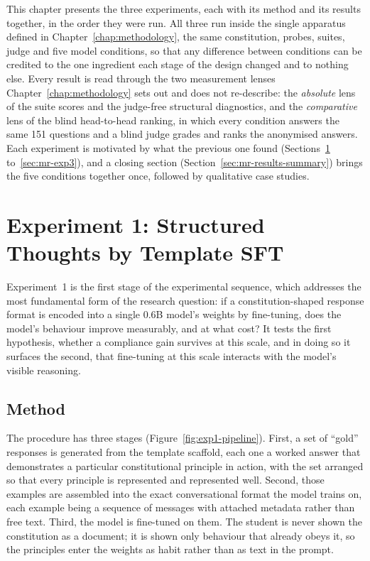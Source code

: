 This chapter presents the three experiments, each with its method and its results together, in the order they were run. All three run inside the single apparatus defined in Chapter~\ref{chap:methodology}, the same constitution, probes, suites, judge and five model conditions, so that any difference between conditions can be credited to the one ingredient each stage of the design changed and to nothing else. Every result is read through the two measurement lenses Chapter~\ref{chap:methodology} sets out and does not re-describe: the \emph{absolute} lens of the suite scores and the judge-free structural diagnostics, and the \emph{comparative} lens of the blind head-to-head ranking, in which every condition answers the same 151 questions and a blind judge grades and ranks the anonymised answers. Each experiment is motivated by what the previous one found (Sections~\ref{sec:mr-exp1} to~\ref{sec:mr-exp3}), and a closing section (Section~\ref{sec:mr-results-summary}) brings the five conditions together once, followed by qualitative case studies.

\section{Experiment 1: Structured Thoughts by Template SFT}
\label{sec:mr-exp1}

Experiment~1 is the first stage of the experimental sequence, which addresses the most fundamental form of the research question: if a constitution-shaped response format is encoded into a single 0.6B model's weights by fine-tuning, does the model's behaviour improve measurably, and at what cost? It tests the first hypothesis, whether a compliance gain survives at this scale, and in doing so it surfaces the second, that fine-tuning at this scale interacts with the model's visible reasoning.

\subsection{Method}
\label{subsec:mr-exp1-method}

The procedure has three stages (Figure~\ref{fig:exp1-pipeline}). First, a set of ``gold'' responses is generated from the template scaffold, each one a worked answer that demonstrates a particular constitutional principle in action, with the set arranged so that every principle is represented and represented well. Second, those examples are assembled into the exact conversational format the model trains on, each example being a sequence of messages with attached metadata rather than free text. Third, the model is fine-tuned on them. The student is never shown the constitution as a document; it is shown only behaviour that already obeys it, so the principles enter the weights as habit rather than as text in the prompt.

